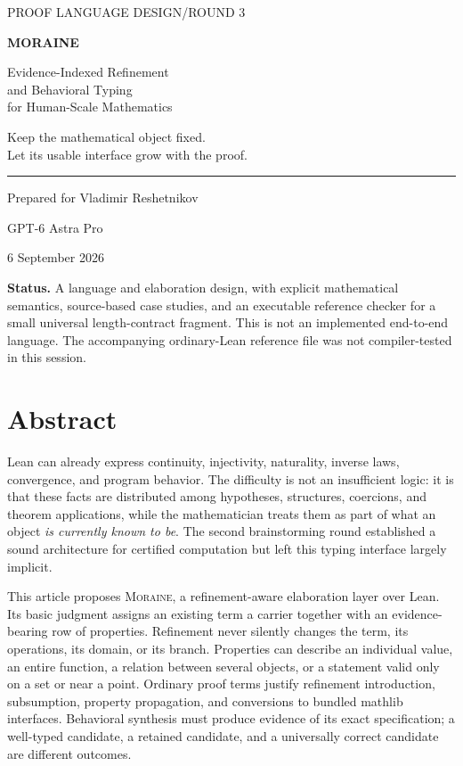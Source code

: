 \documentclass[11pt,letterpaper]{article}
\newcommand{\moraine}{\textsc{Moraine}}
\theoremstyle{definition}
\theoremstyle{remark}
\begin{document}
\hypersetup{pageanchor=false}
\begin{titlepage}
\color{ink}
{\sffamily\large PROOF LANGUAGE DESIGN\quad /\quad ROUND 3\par}
\vspace{.9in}
{\sffamily\bfseries\fontsize{40}{44}\selectfont MORAINE\par}
\vspace{.25in}
{\sffamily\fontsize{23}{29}\selectfont Evidence-Indexed Refinement\\and Behavioral Typing\\for Human-Scale Mathematics\par}
\vspace{.55in}
{\large Keep the mathematical object fixed.\\Let its usable interface grow with the proof.\par}
\vfill
\rule{\textwidth}{.8pt}
Prepared for Vladimir Reshetnikov\par
GPT-6 Astra Pro\par
6 September 2026\par
\vspace{.22in}
\textbf{Status.} A language and elaboration design, with explicit mathematical
semantics, source-based case studies, and an executable reference checker for a
small universal length-contract fragment. This is not an implemented end-to-end
language. The accompanying ordinary-Lean reference file was not compiler-tested
in this session.
\end{titlepage}
\hypersetup{pageanchor=true}
\section*{Abstract}
Lean can already express continuity, injectivity, naturality, inverse laws,
convergence, and program behavior. The difficulty is not an insufficient logic:
it is that these facts are distributed among hypotheses, structures, coercions,
and theorem applications, while the mathematician treats them as part of what an
object \emph{is currently known to be}. The second brainstorming round established
a sound architecture for certified computation but left this typing interface
largely implicit.

This article proposes \moraine, a refinement-aware elaboration layer over Lean.
Its basic judgment assigns an existing term a carrier together with an
evidence-bearing row of properties. Refinement never silently changes the term,
its operations, its domain, or its branch. Properties can describe an individual
value, an entire function, a relation between several objects, or a statement
valid only on a set or near a point. Ordinary proof terms justify refinement
introduction, subsumption, property propagation, and conversions to bundled
mathlib interfaces. Behavioral synthesis must produce evidence of its exact
specification; a well-typed candidate, a retained candidate, and a universally
correct candidate are different outcomes.
\end{document}
